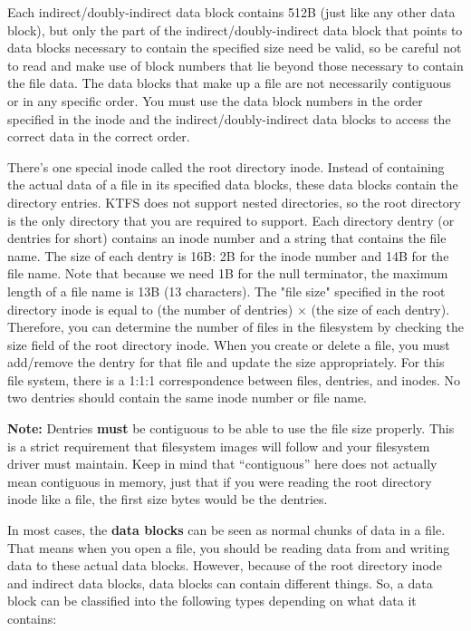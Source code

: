 \documentclass{article}
\begin{document}
Each indirect/doubly-indirect data block contains 512B (just like any other data block), but only the part of the indirect/doubly-indirect data block that points to data blocks necessary to contain the
specified size need be valid, so be careful not to read and make
use of block numbers that lie beyond those necessary to contain
the file data. The data blocks that make up a file are not necessarily contiguous
or in any specific order. You must use the data block numbers in the order specified in the inode and the indirect/doubly-indirect data blocks 
to access the correct data in the correct order.

There's one special inode called the root directory inode.
Instead of containing the actual data of a file in its specified data blocks, 
these data blocks contain the directory entries. KTFS does not support nested directories, so the root directory
is the only directory that you are required to support.
Each directory dentry (or dentries for short) contains an inode number and a string that contains the file name.
The size of each dentry is 16B: 2B for the inode number and 14B for the file name.
Note that because we need 1B for the null terminator, the maximum length of a file name is 13B (13 characters).
The "file size" specified in the root directory inode is equal to (the number of dentries) $\times$ (the size of each dentry). Therefore, you can
determine the number of files in the filesystem by checking the size field of the root directory inode. When you create or delete a file,
you must add/remove the dentry for that file and update the size appropriately.
For this file system, there is a 1:1:1 correspondence between files, dentries, and inodes. 
No two dentries should contain the same inode number or file name.

\textbf{Note:} Dentries \textbf{must} be contiguous to be able to use the file size properly. This is a strict requirement that 
filesystem images will follow and your filesystem driver must maintain. Keep in mind that ``contiguous'' here does not actually mean
contiguous in memory, just that if you were reading the root directory inode like a file, the first {\fix size} bytes would be the dentries.

In most cases, the \textbf{data blocks} can be seen as normal chunks of data in a file. That means when you open a file,
you should be reading data from and writing data to these actual data blocks. However, because of the root directory inode and indirect data blocks,
data blocks can contain different things. So, a data block can be classified into the following types depending on what data it contains:
\end{document}
